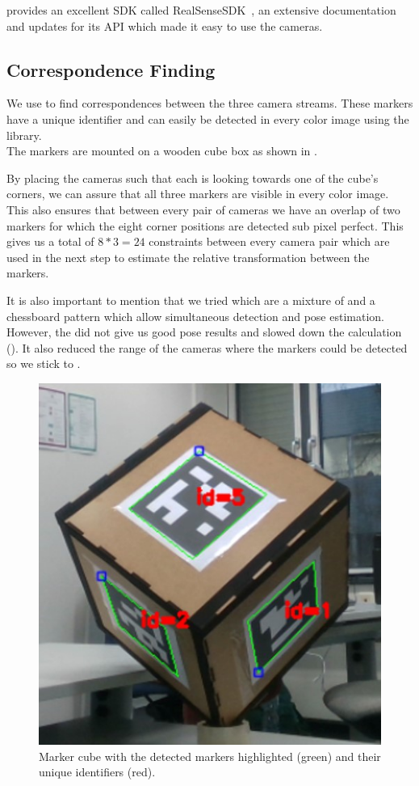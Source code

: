 \documentclass[10pt,twocolumn,letterpaper]{article}
\begin{document}
\intel{} provides an excellent SDK called \mbox{RealSenseSDK~\cite{RealSenseSDK}}, an extensive documentation and updates for its API which made it easy to use the cameras.

\subsection{Correspondence Finding}
We use \aruco{} to find correspondences between the three camera streams. These markers have a unique identifier and can easily be detected in every color image using the \opencv{} library.\\
The markers are mounted on a wooden cube box as shown in .

By placing the cameras such that each is looking towards one of the cube's corners, we can assure that all three markers are visible in every color image. This also ensures that between every pair of cameras we have an overlap of two markers for which the eight corner positions are detected sub pixel perfect. This gives us a total of $8*3=24$ constraints between every camera pair which are used in the next step to estimate the relative transformation between the markers.

It is also important to mention that we tried \charuco{} which are a mixture of \aruco{} and a chessboard pattern which allow simultaneous detection and pose estimation. However, the \charuco{} did not give us good pose results and slowed down the calculation (). It also reduced the range of the cameras where the markers could be detected so we stick to \aruco{}. 
%
%
\begin{figure}[t]
	\begin{center}
		\includegraphics[width=0.6\linewidth]{imgs/cube}
	\end{center}
	\caption{Marker cube with the detected markers highlighted (green) and their unique identifiers (red).}
	\label{fig:cube}
\end{figure}
%
%
\end{document}
